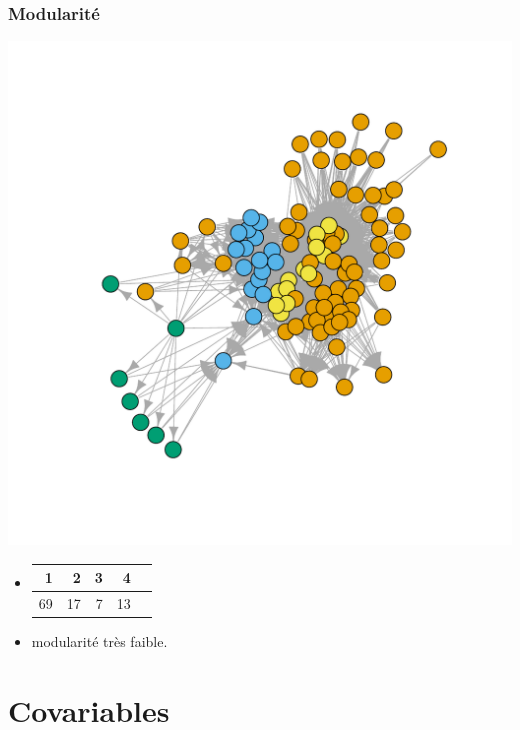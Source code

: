 \documentclass[nopagenumber,9pt]{beamer}
\begin{document}
\begin{frame}
 \frametitle{Modularité}
\begin{center}
  \includegraphics[scale=.3]{plots/chilean_modularity.pdf}
 \end{center}
 
 
 
 \begin{itemize}
  \item
  \begin{tabular}{rrrrr}
  \hline
 1 & 2 & 3 & 4 \\ 
  \hline
  69 &  17 &   7 &  13 \\ 
   \hline
\end{tabular}
\item modularité très faible.
 \end{itemize}

 
\end{frame}



\section{Covariables}
\end{document}
